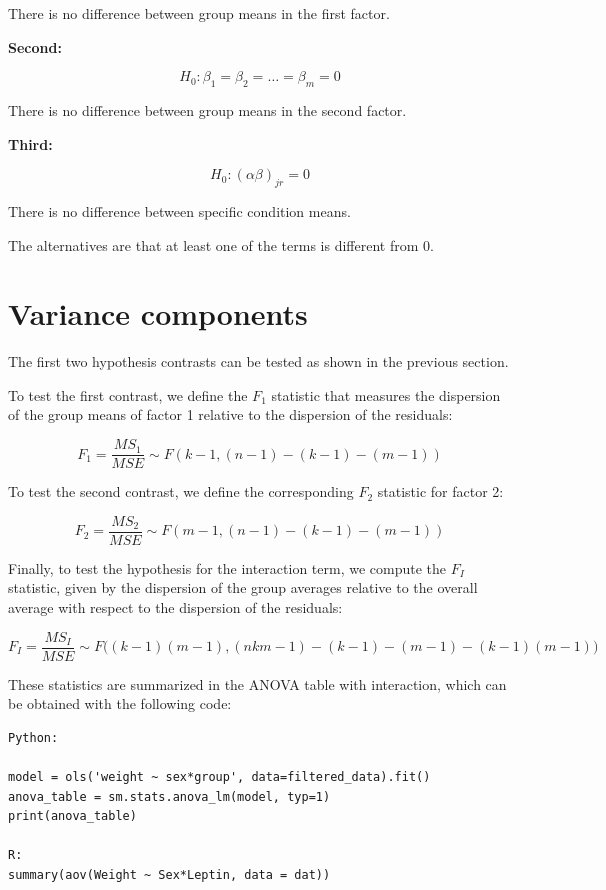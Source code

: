 \documentclass[
]{book}
\begin{document}
There is no difference between group means in the first factor.

\textbf{Second:}

\[
H_0: \beta_1 = \beta_2 = \dots = \beta_m = 0
\]

There is no difference between group means in the second factor.

\textbf{Third:}

\[
H_0: (\alpha\beta)_{jr} = 0
\]

There is no difference between specific condition means.

The alternatives are that at least one of the terms is different from 0.

\hypertarget{variance-components-1}{%
\section{Variance components}\label{variance-components-1}}

The first two hypothesis contrasts can be tested as shown in the previous section.

To test the first contrast, we define the \(F_1\) statistic that measures the dispersion of the group means of factor 1 relative to the dispersion of the residuals:

\[
F_1 = \frac{MS_1}{MSE} \sim F(k-1, (n-1) - (k-1) - (m-1))
\]

To test the second contrast, we define the corresponding \(F_2\) statistic for factor 2:

\[
F_2 = \frac{MS_2}{MSE} \sim F(m-1, (n-1) - (k-1) - (m-1))
\]

Finally, to test the hypothesis for the interaction term, we compute the \(F_I\) statistic, given by the dispersion of the group averages relative to the overall average with respect to the dispersion of the residuals:

\[
F_I = \frac{MS_I}{MSE} \sim F\Big((k-1)(m-1), (nkm-1) - (k-1) - (m-1) - (k-1)(m-1)\Big)
\]

These statistics are summarized in the ANOVA table with interaction, which can be obtained with the following code:

\begin{verbatim}
Python:

model = ols('weight ~ sex*group', data=filtered_data).fit()
anova_table = sm.stats.anova_lm(model, typ=1)
print(anova_table)

R:
summary(aov(Weight ~ Sex*Leptin, data = dat))
\end{verbatim}
\end{document}
